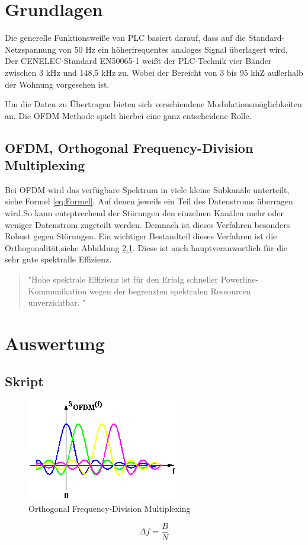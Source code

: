 \documentclass[a4paper]{scrreprt}
\begin{document}
\tableofcontents 
\chapter{Grundlagen}
Die generelle Funktionsweiße von PLC basiert darauf, dass auf die Standard-Netzspannung von 50 Hz ein höherfrequentes analoges Signal überlagert wird.
Der CENELEC-Standard EN50065-1 weißt der PLC-Technik vier Bänder zwischen 3 kHz und 148,5 kHz zu. Wobei der Bereicht von 3 bis 95 khZ außerhalb der Wohnung vorgesehen ist. \cite{Zitat01}

Um die Daten zu Übertragen bieten sich verschiendene Modulationsmöglichkeiten an. Die OFDM-Methode spielt hierbei eine ganz entscheidene Rolle.

\section{OFDM, Orthogonal Frequency-Division Multiplexing}
Bei OFDM wird das verfügbare Spektrum in viele kleine Subkanäle unterteilt, siehe Formel \ref{eq:Formel}. Auf denen jeweils ein Teil des Datenstroms überragen wird.So kann entsptrechend der Störungen den einzelnen Kanälen mehr oder weniger Datenstrom zugeteilt werden. Demnach ist dieses Verfahren besonders Robust gegen Störungen.
Ein wichtiger Bestandteil dieses Verfahren ist die Orthogonalität,siehe Abbildung \ref{fig:OFDM}. Diese ist auch hauptveranwortlich für die sehr gute spektralle Effizienz.\cite{Zitat02}
 
\begin{quotation}
  "Hohe spektrale Effizienz ist für den Erfolg schneller Powerline-Kommunikation wegen der begrenzten spektralen Ressourcen unverzichtbar. \cite{Zitat02}"
\end{quotation}


\chapter{Auswertung}
\section{Skript}

%



\begin{figure}[!htp]
\centering
\includegraphics[scale=0.6]{./OFDM.png}
\caption{Orthogonal Frequency-Division Multiplexing}
\label{fig:OFDM}
\end{figure}

\begin{equation}
\label{eq:Formel}
 \Delta f = \frac{B}{N}

\end{equation}





\end{document}
